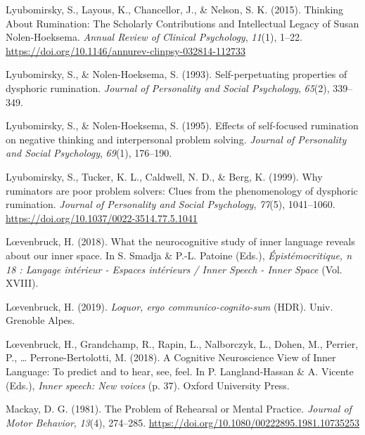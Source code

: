 \documentclass[a4paper,12pt,twoside,openright,oldfontcommands,final]{memoir}
\begin{document}
\leavevmode\hypertarget{ref-lyubomirsky_thinking_2015}{}%
Lyubomirsky, S., Layous, K., Chancellor, J., \& Nelson, S. K. (2015). Thinking About Rumination: The Scholarly Contributions and Intellectual Legacy of Susan Nolen-Hoeksema. \emph{Annual Review of Clinical Psychology}, \emph{11}(1), 1--22. \url{https://doi.org/10.1146/annurev-clinpsy-032814-112733}

\leavevmode\hypertarget{ref-lyubomirsky_self-perpetuating_1993}{}%
Lyubomirsky, S., \& Nolen-Hoeksema, S. (1993). Self-perpetuating properties of dysphoric rumination. \emph{Journal of Personality and Social Psychology}, \emph{65}(2), 339--349.

\leavevmode\hypertarget{ref-lyubomirsky_effects_1995}{}%
Lyubomirsky, S., \& Nolen-Hoeksema, S. (1995). Effects of self-focused rumination on negative thinking and interpersonal problem solving. \emph{Journal of Personality and Social Psychology}, \emph{69}(1), 176--190.

\leavevmode\hypertarget{ref-lyubomirsky_why_1999}{}%
Lyubomirsky, S., Tucker, K. L., Caldwell, N. D., \& Berg, K. (1999). Why ruminators are poor problem solvers: Clues from the phenomenology of dysphoric rumination. \emph{Journal of Personality and Social Psychology}, \emph{77}(5), 1041--1060. \url{https://doi.org/10.1037/0022-3514.77.5.1041}

\leavevmode\hypertarget{ref-loevenbruck_what_2018}{}%
Lœvenbruck, H. (2018). What the neurocognitive study of inner language reveals about our inner space. In S. Smadja \& P.-L. Patoine (Eds.), \emph{Épistémocritique, n 18 : Langage intérieur - Espaces intérieurs / Inner Speech - Inner Space} (Vol. XVIII).

\leavevmode\hypertarget{ref-loevenbruck_loquor_2019}{}%
Lœvenbruck, H. (2019). \emph{Loquor, ergo communico-cognito-sum} (HDR). Univ. Grenoble Alpes.

\leavevmode\hypertarget{ref-loevenbruck_cognitive_2018}{}%
Lœvenbruck, H., Grandchamp, R., Rapin, L., Nalborczyk, L., Dohen, M., Perrier, P., \ldots{} Perrone-Bertolotti, M. (2018). A Cognitive Neuroscience View of Inner Language: To predict and to hear, see, feel. In P. Langland-Hassan \& A. Vicente (Eds.), \emph{Inner speech: New voices} (p. 37). Oxford University Press.

\leavevmode\hypertarget{ref-mackay_problem_1981}{}%
Mackay, D. G. (1981). The Problem of Rehearsal or Mental Practice. \emph{Journal of Motor Behavior}, \emph{13}(4), 274--285. \url{https://doi.org/10.1080/00222895.1981.10735253}
\end{document}
